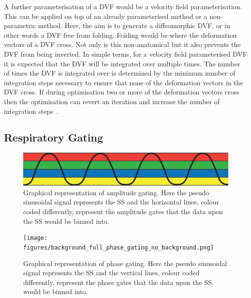                 A further parameterisation of a \gls{DVF} would be a velocity field parameterisation. This can be applied on top of an already parameterised method or a non-parametric method. Here, the aim is to generate a diffeomorphic \gls{DVF}, or in other words a \gls{DVF} free from folding. Folding would be where the deformation vectors of a \gls{DVF} cross. Not only is this non-anatomical but it also prevents the \gls{DVF} from being inverted. In simple terms, for a velocity field parameterised \gls{DVF} it is expected that the \gls{DVF} will be integrated over multiple times. The number of times the \gls{DVF} is integrated over is determined by the minimum number of integration steps necessary to ensure that none of the deformation vectors in the \gls{DVF} cross. If during optimisation two or more of the deformation vectors cross then the optimisation can revert an iteration and increase the number of integration steps~\parencite{Modat2012ParametricField}.
        
        \subsection{Respiratory Gating} \label{sec:respiratory_gating}
            
            \begin{figure}
                \centering
                    
                \includegraphics[width=1.0\linewidth]{figures/background_amplitude_gating.png}
                    
                \captionsetup{singlelinecheck=false}
                \caption{
                    Graphical representation of amplitude gating. Here the pseudo sinusoidal signal represents the \gls{SS} and the horizontal lines, colour coded differently, represent the amplitude gates that the data upon the \gls{SS} would be binned into.
                }
                \label{fig:respiratory_gating_amplitude_gating}
            \end{figure}
            
            \begin{figure}
                \centering
                    
                \texttt{[image: figures/background\_full\_phase\_gating\_no\_background.png]}
                    
                \captionsetup{singlelinecheck=false}
                \caption{
                    Graphical representation of phase gating. Here the pseudo sinusoidal signal represents the \gls{SS} and the vertical lines, colour coded differently, represent the phase gates that the data upon the \gls{SS} would be binned into.
                }
                \label{fig:respiratory_gating_full_phase_gating}
            \end{figure}
            
